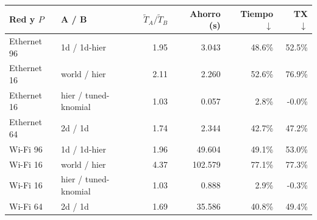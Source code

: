 \begin{center}\small
\begin{tabular}{llrrrr}
\toprule
Red y $P$ & A / B & $\tilde T_A/\tilde T_B$ & Ahorro (s) & Tiempo $\downarrow$ & TX $\downarrow$ \\
\midrule
Ethernet 96 & 1d / 1d-hier & 1.95 & 3.043 & 48.6\% & 52.5\% \\
Ethernet 16 & world / hier & 2.11 & 2.260 & 52.6\% & 76.9\% \\
Ethernet 16 & hier / tuned-knomial & 1.03 & 0.057 & 2.8\% & -0.0\% \\
Ethernet 64 & 2d / 1d & 1.74 & 2.344 & 42.7\% & 47.2\% \\
Wi-Fi 96 & 1d / 1d-hier & 1.96 & 49.604 & 49.1\% & 53.0\% \\
Wi-Fi 16 & world / hier & 4.37 & 102.579 & 77.1\% & 77.3\% \\
Wi-Fi 16 & hier / tuned-knomial & 1.03 & 0.888 & 2.9\% & -0.3\% \\
Wi-Fi 64 & 2d / 1d & 1.69 & 35.586 & 40.8\% & 49.4\% \\
\bottomrule
\end{tabular}
\end{center}
